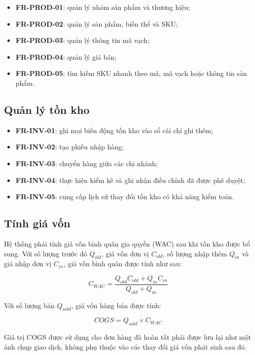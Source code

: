 \begin{itemize}
    \item \textbf{FR-PROD-01}: quản lý nhóm sản phẩm và thương hiệu;
    \item \textbf{FR-PROD-02}: quản lý sản phẩm, biến thể và SKU;
    \item \textbf{FR-PROD-03}: quản lý thông tin mã vạch;
    \item \textbf{FR-PROD-04}: quản lý giá bán;
    \item \textbf{FR-PROD-05}: tìm kiếm SKU nhanh theo mã, mã vạch hoặc thông tin sản phẩm.
\end{itemize}

\subsection{Quản lý tồn kho}

\begin{itemize}
    \item \textbf{FR-INV-01}: ghi mọi biến động tồn kho vào sổ cái chỉ ghi thêm;
    \item \textbf{FR-INV-02}: tạo phiếu nhập hàng;
    \item \textbf{FR-INV-03}: chuyển hàng giữa các chi nhánh;
    \item \textbf{FR-INV-04}: thực hiện kiểm kê và ghi nhận điều chỉnh đã được phê duyệt;
    \item \textbf{FR-INV-05}: cung cấp lịch sử thay đổi tồn kho có khả năng kiểm toán.
\end{itemize}

\subsection{Tính giá vốn}

Hệ thống phải tính giá vốn bình quân gia quyền (WAC) sau khi tồn kho được bổ sung. Với số
lượng trước đó $Q_{old}$, giá vốn đơn vị $C_{old}$, số lượng nhập thêm $Q_{in}$ và giá nhập
đơn vị $C_{in}$, giá vốn bình quân được tính như sau:

\[
C_{WAC} =
\frac{Q_{old}C_{old} + Q_{in}C_{in}}
     {Q_{old}+Q_{in}}
\]

Với số lượng bán $Q_{sold}$, giá vốn hàng bán được tính:

\[
COGS = Q_{sold} \times C_{WAC}
\]

Giá trị COGS được sử dụng cho đơn hàng đã hoàn tất phải được lưu lại như một ảnh chụp giao dịch,
không phụ thuộc vào các thay đổi giá vốn phát sinh sau đó.

